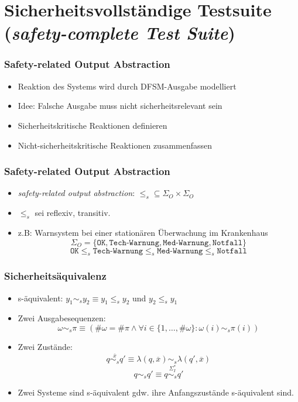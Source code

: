 \section{Sicherheitsvollständige Testsuite (\emph{safety-complete Test Suite})}
\begin{frame}
\frametitle{Safety-related Output Abstraction}
\begin{itemize}
  \item Reaktion des Systems wird durch DFSM-Ausgabe modelliert
  \item Idee: Falsche Ausgabe muss nicht sicherheitsrelevant sein
  \item Sicherheitskritische Reaktionen definieren
  \item Nicht-sicherheitskritische Reaktionen zusammenfassen
\end{itemize}
\end{frame}

\begin{frame}
\frametitle{Safety-related Output Abstraction}
\begin{itemize}
  \item \emph{safety-related output abstraction}: $\leq_s \subseteq \Sigma_O \times \Sigma_O$
  \item $\leq_s$ sei reflexiv, transitiv.
  \item z.B: Warnsystem bei einer stationären Überwachung im Krankenhaus\\
  $$\Sigma_O = \{\texttt{OK}, \texttt{Tech-Warnung}, \texttt{Med-Warnung}, \texttt{Notfall}\}$$
  $$\texttt{OK} \leq_s \texttt{Tech-Warnung} \leq_s \texttt{Med-Warnung} \leq_s \texttt{Notfall}$$
\end{itemize}
\end{frame}

\begin{frame}
  \frametitle{Sicherheitsäquivalenz}
  \begin{itemize}
    \item s-äquivalent: $y_1 \sim_s y_2 \equiv y_1 \leq_s y_2$ und $y_2 \leq_s y_1$
    \item Zwei Ausgabesequenzen: $$\omega \sim_s \pi \equiv (\#\omega = \#\pi \wedge \forall i \in \{1,\ldots,\#\omega\} : \omega(i) \sim_s \pi(i))$$ 
    \item Zwei Zustände: $$q \overset{\overline{x}}{\sim_s} q' \equiv \lambda(q,\overline{x}) \sim_s \lambda(q', \overline{x})$$
    $$q \sim_s q' \equiv q \overset{\Sigma_I^*}{\sim_s} q'$$
    \item Zwei Systeme sind s-äquivalent gdw. ihre Anfangszustände s-äquivalent sind.
  \end{itemize}
  \end{frame}

